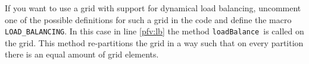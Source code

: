 \documentclass[11pt,a4paper,headinclude,footinclude,DIV16,normalheadings]{scrreprt}
\newtheorem{lst}{Listing}
\begin{document}
If you want to use a grid with support for dynamical load balancing, uncomment 
one of the possible definitions for such a grid in the code and define the
macro \lstinline!LOAD_BALANCING!. In this case in line \ref{pfv:lb} the method
\lstinline!loadBalance!\ is called on the grid.
This method re-partitions the grid in a way such that on every partition there
is an equal amount of grid elements.








 




% 
\end{document}
